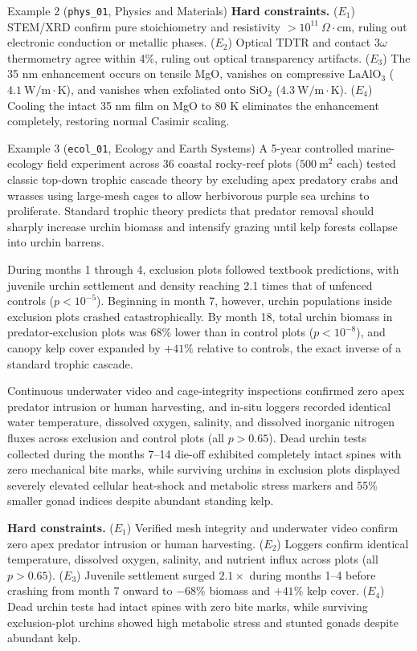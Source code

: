\documentclass{article}
\begin{document}
\begin{scenariobox}{Example 2 (\texttt{phys\_01}, Physics and Materials)}
\textbf{Hard constraints.}
($E_1$) STEM/XRD confirm pure stoichiometry and resistivity $> 10^{11}\ \Omega\cdot\mathrm{cm}$, ruling out electronic conduction or metallic phases.
($E_2$) Optical TDTR and contact $3\omega$ thermometry agree within 4\%, ruling out optical transparency artifacts.
($E_3$) The 35 nm enhancement occurs on tensile MgO, vanishes on compressive $\mathrm{LaAlO_3}$ ($4.1\ \mathrm{W/m\cdot K}$), and vanishes when exfoliated onto $\mathrm{SiO_2}$ ($4.3\ \mathrm{W/m\cdot K}$).
($E_4$) Cooling the intact 35 nm film on MgO to 80 K eliminates the enhancement completely, restoring normal Casimir scaling.
\end{scenariobox}

\begin{scenariobox}{Example 3 (\texttt{ecol\_01}, Ecology and Earth Systems)}
A 5-year controlled marine-ecology field experiment across 36 coastal rocky-reef plots ($500\ \mathrm{m}^2$ each) tested classic top-down trophic cascade theory by excluding apex predatory crabs and wrasses using large-mesh cages to allow herbivorous purple sea urchins to proliferate. Standard trophic theory predicts that predator removal should sharply increase urchin biomass and intensify grazing until kelp forests collapse into urchin barrens.

During months 1 through 4, exclusion plots followed textbook predictions, with juvenile urchin settlement and density reaching 2.1 times that of unfenced controls ($p < 10^{-5}$). Beginning in month 7, however, urchin populations inside exclusion plots crashed catastrophically. By month 18, total urchin biomass in predator-exclusion plots was 68\% lower than in control plots ($p < 10^{-8}$), and canopy kelp cover expanded by $+41\%$ relative to controls, the exact inverse of a standard trophic cascade.

Continuous underwater video and cage-integrity inspections confirmed zero apex predator intrusion or human harvesting, and in-situ loggers recorded identical water temperature, dissolved oxygen, salinity, and dissolved inorganic nitrogen fluxes across exclusion and control plots (all $p > 0.65$). Dead urchin tests collected during the months 7--14 die-off exhibited completely intact spines with zero mechanical bite marks, while surviving urchins in exclusion plots displayed severely elevated cellular heat-shock and metabolic stress markers and 55\% smaller gonad indices despite abundant standing kelp.

\textbf{Hard constraints.}
($E_1$) Verified mesh integrity and underwater video confirm zero apex predator intrusion or human harvesting.
($E_2$) Loggers confirm identical temperature, dissolved oxygen, salinity, and nutrient influx across plots (all $p > 0.65$).
($E_3$) Juvenile settlement surged $2.1\times$ during months 1--4 before crashing from month 7 onward to $-68\%$ biomass and $+41\%$ kelp cover.
($E_4$) Dead urchin tests had intact spines with zero bite marks, while surviving exclusion-plot urchins showed high metabolic stress and stunted gonads despite abundant kelp.
\end{scenariobox}
\end{document}
